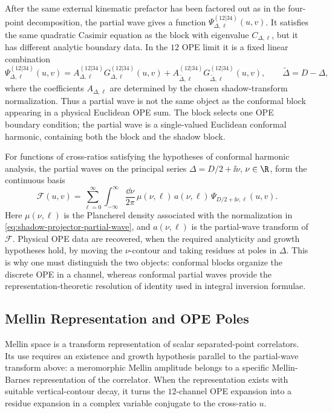 After the same external kinematic prefactor has been factored out as in the
four-point decomposition, the partial wave gives a function
\(\Psi_{\Delta,\ell}^{(12|34)}(u,v)\).  It satisfies the same quadratic
Casimir equation as the block with eigenvalue \(C_{\Delta,\ell}\), but it has
different analytic boundary data.  In the \(12\) OPE limit it is a fixed
linear combination
\begin{equation}
  \Psi_{\Delta,\ell}^{(12|34)}(u,v)
  =
  A_{\Delta,\ell}^{(12|34)}
  G_{\Delta,\ell}^{(12|34)}(u,v)
  +
  A_{\widetilde\Delta,\ell}^{(12|34)}
  G_{\widetilde\Delta,\ell}^{(12|34)}(u,v),
  \qquad
  \widetilde\Delta=D-\Delta ,
  \label{eq:partial-wave-block-shadow-block}
\end{equation}
where the coefficients \(A_{\Delta,\ell}\) are determined by the chosen
shadow-transform normalization.  Thus a partial wave is not the same object
as the conformal block appearing in a physical Euclidean OPE sum.  The block
selects one OPE boundary condition; the partial wave is a single-valued
Euclidean conformal harmonic, containing both the block and the shadow block.

For functions of cross-ratios satisfying the hypotheses of conformal harmonic
analysis, the partial waves on the principal series
\(\Delta=D/2+\ii\nu\), \(\nu\in\R\), form the continuous basis
\begin{equation}
  \mathcal F(u,v)
  =
  \sum_{\ell=0}^{\infty}
  \int_{-\infty}^{\infty}\frac{\dd\nu}{2\pi}\,
  \mu(\nu,\ell)\,
  a(\nu,\ell)\,
  \Psi_{D/2+\ii\nu,\ell}(u,v).
  \label{eq:conformal-partial-wave-plancherel}
\end{equation}
Here \(\mu(\nu,\ell)\) is the Plancherel density associated with the
normalization in \eqref{eq:shadow-projector-partial-wave}, and
\(a(\nu,\ell)\) is the partial-wave transform of \(\mathcal F\).  Physical
OPE data are recovered, when the required analyticity and growth hypotheses
hold, by moving the \(\nu\)-contour and taking residues at poles in
\(\Delta\).  This is why one must distinguish the two objects: conformal
blocks organize the discrete OPE in a channel, whereas conformal partial
waves provide the representation-theoretic resolution of identity used in
integral inversion formulae.

\subsection{Mellin Representation and OPE Poles}

Mellin space is a transform representation of scalar separated-point
correlators.  Its use requires an existence and growth hypothesis parallel to
the partial-wave transform above: a meromorphic Mellin amplitude belongs to a
specific Mellin-Barnes representation of the correlator.  When the
representation exists with suitable vertical-contour decay, it turns the
\(12\)-channel OPE expansion into a residue expansion in a complex variable
conjugate to the cross-ratio \(u\).

